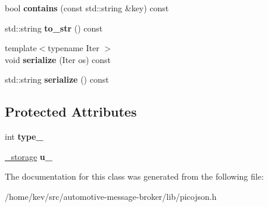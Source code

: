 \begin{DoxyCompactItemize}
\item 
\hypertarget{classpicojson_1_1value_a14dbd110c8820a94ad4212e3a6b8e95b}{bool {\bfseries contains} (const std\+::string \&key) const }\label{classpicojson_1_1value_a14dbd110c8820a94ad4212e3a6b8e95b}

\item 
\hypertarget{classpicojson_1_1value_aca8f960de0545ae8189189109da47a35}{std\+::string {\bfseries to\+\_\+str} () const }\label{classpicojson_1_1value_aca8f960de0545ae8189189109da47a35}

\item 
\hypertarget{classpicojson_1_1value_a0068248fbccd6b64a367248c1f30cb1f}{{\footnotesize template$<$typename Iter $>$ }\\void {\bfseries serialize} (Iter os) const }\label{classpicojson_1_1value_a0068248fbccd6b64a367248c1f30cb1f}

\item 
\hypertarget{classpicojson_1_1value_a1438a988f179614a3205ddaabac7db57}{std\+::string {\bfseries serialize} () const }\label{classpicojson_1_1value_a1438a988f179614a3205ddaabac7db57}

\end{DoxyCompactItemize}
\subsection*{Protected Attributes}
\begin{DoxyCompactItemize}
\item 
\hypertarget{classpicojson_1_1value_af77ae4525a20f6fce6ea9ff1c4709312}{int {\bfseries type\+\_\+}}\label{classpicojson_1_1value_af77ae4525a20f6fce6ea9ff1c4709312}

\item 
\hypertarget{classpicojson_1_1value_aa7948fe10fcbc19ab9c8dee5e5099f77}{\hyperlink{unionpicojson_1_1value_1_1__storage}{\+\_\+storage} {\bfseries u\+\_\+}}\label{classpicojson_1_1value_aa7948fe10fcbc19ab9c8dee5e5099f77}

\end{DoxyCompactItemize}


The documentation for this class was generated from the following file\+:\begin{DoxyCompactItemize}
\item 
/home/kev/src/automotive-\/message-\/broker/lib/picojson.\+h\end{DoxyCompactItemize}
